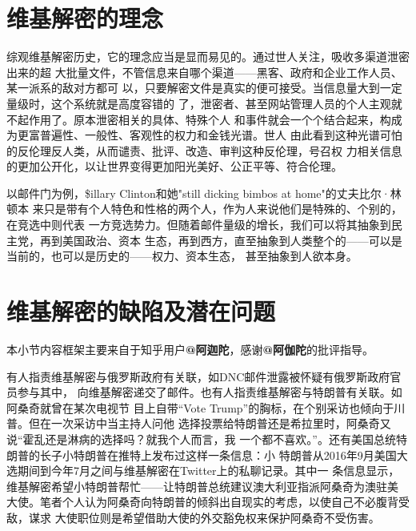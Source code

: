 \section{维基解密的理念}

综观维基解密历史，它的理念应当是显而易见的。通过世人关注，吸收多渠道泄密出来的超
大批量文件，不管信息来自哪个渠道——黑客、政府和企业工作人员、某一派系的敌对方都可
以，只要解密文件是真实的便可接受。当信息量大到一定量级时，这个系统就是高度容错的
了，泄密者、甚至网站管理人员的个人主观就不起作用了。原本泄密相关的具体、特殊个人
和事件就会一个个结合起来，构成为更富普遍性、一般性、客观性的权力和金钱光谱。世人
由此看到这种光谱可怕的反伦理反人类，从而谴责、批评、改造、审判这种反伦理，号召权
力相关信息的更加公开化，以让世界变得更加阳光美好、公正平等、符合伦理。

以邮件门为例，\$illary Clinton和她"still dicking bimbos at home"的丈夫比尔·林顿本
来只是带有个人特色和性格的两个人，作为人来说他们是特殊的、个别的，在竞选中则代表
一方竞选势力。但随着邮件量级的增长，我们可以将其抽象到民主党，再到美国政治、资本
生态，再到西方，直至抽象到人类整个的——可以是当前的，也可以是历史的——权力、资本生态，
甚至抽象到人欲本身。

\section{维基解密的缺陷及潜在问题}

本小节内容框架主要来自于知乎用户\textbf{@阿迦陀}，感谢\textbf{@阿伽陀}的批评指导。

有人指责维基解密与俄罗斯政府有关联，如DNC邮件泄露被怀疑有俄罗斯政府官员参与其中，
向维基解密递交了邮件。也有人指责维基解密与特朗普有关联。如阿桑奇就曾在某次电视节
目上自带“Vote Trump”的胸标，在个别采访也倾向于川普。但在一次采访中当主持人问他
选择投票给特朗普还是希拉里时，阿桑奇又说“霍乱还是淋病的选择吗？就我个人而言，我
一个都不喜欢。”。还有美国总统特朗普的长子小特朗普在推特上发布过这样一条信息：小
特朗普从2016年9月美国大选期间到今年7月之间与维基解密在Twitter上的私聊记录。其中一
条信息显示，维基解密希望小特朗普帮忙——让特朗普总统建议澳大利亚指派阿桑奇为澳驻美
大使。笔者个人认为阿桑奇向特朗普的倾斜出自现实的考虑，以使自己不必腹背受敌，谋求
大使职位则是希望借助大使的外交豁免权来保护阿桑奇不受伤害。

